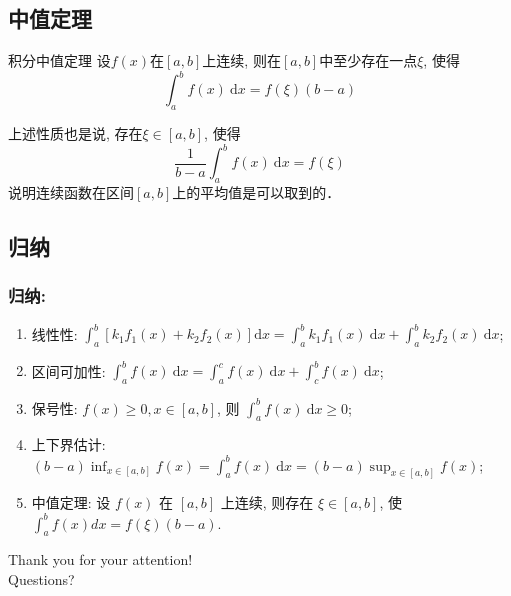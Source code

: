 \documentclass[
10pt,
aspectratio=43,
]{beamer}
\begin{document}
\subsection{中值定理}
\begin{frame}
	\begin{block}{积分中值定理}
		设$f(x)$在$[a,b]$上连续, 则在$[a,b]$中至少存在一点$\xi$, 使得
		\[ \int_a^b f(x)\mathrm{~d} x = f(\xi)(b-a) \]
	\end{block}
	\pause
	\begin{block}{}上述性质也是说, 存在$\xi\in[a,b]$, 使得
		\[ \frac1{b-a} \int_a^b f(x)\mathrm{~d} x = f(\xi)\]
		说明连续函数在区间$[a,b]$上的平均值是可以取到的．
	\end{block}
\end{frame}

\subsection{归纳}
\begin{frame}
	\frametitle{归纳:}
	\everymath{\displaystyle}
	\begin{enumerate}
		\item 线性性: $\int_a^b[k_1f_1(x) + k_2f_2(x)] \mathrm{d} x=\int_a^b k_1f_1(x) \mathrm{~d} x+\int_a^b k_2f_2(x) \mathrm{~d}x$;
		\item 区间可加性: $\int_a^b f(x) \mathrm{~d} x=\int_a^c f(x) \mathrm{~d} x+\int_c^b f(x) \mathrm{~d} x$;
		\item 保号性: $f(x) \geq 0, x\in[a,b]$, 则 $\int_a^b f(x) \mathrm{~d} x\geq 0$;
		\item 上下界估计: $(b-a)\inf_{x\in[a,b]}f(x)=\int_a^{b} f(x) \mathrm{~d} x=(b-a)\sup_{x\in[a,b]}f(x)$;
		\item 中值定理: 设 $f(x)$ 在 $[a, b]$ 上连续, 则存在 $\xi\in[a, b]$, 使 $\int_a^b f(x) d x=f(\xi)(b-a)$.
	\end{enumerate}
	\vspace{0.5cm}
\end{frame}

\begin{frame}[plain]
	\vfill
	\centering
	{
		\centering \Huge \color{white} Thank you for your attention!\\[10pt]Questions?
	}
	\vfill
\end{frame}
\end{document}
